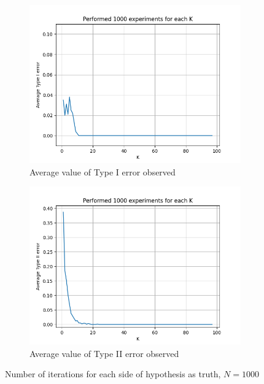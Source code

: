 \documentclass[fleqn, 11pt]{article}
\begin{document}
\newpage
\begin{figure}[H]
    \centering
    \begin{subfigure}[H]{0.49\textwidth}
        \centering
        \includegraphics[width=\textwidth]{P4/type1_1000.png}
        \caption[]{Average value of Type I error observed}
    \end{subfigure}
    \begin{subfigure}[H]{0.49\textwidth}
        \centering
        \includegraphics[width=\textwidth]{P4/type2_1000.png}
        \caption[]{Average value of Type II error observed}
    \end{subfigure}
    \caption{Number of iterations for each side of hypothesis as truth, $N = 1000$}
\end{figure}
\end{document}
